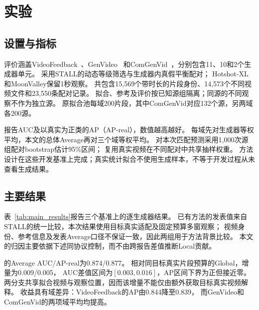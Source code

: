 \section{实验}
\label{sec:experiments}

\subsection{设置与指标}
评价涵盖VideoFeedback~\cite{he2024videoscore}、GenVideo~\cite{chen2024genvideo}
和ComGenVid~\cite{benhayun2026stall}，分别包含11、10和2个生成器单元。
采用STALL的动态等级筛选与生成器内真假平衡配对；
Hotshot-XL和MoonValley保留1秒观察。
共包含15,569个带时长的片段身份、14,573个不同视频文件和23,550条配对记录。
拟合、参考及评价按已知源组隔离；同源的不同观察不作为独立源。
原拟合池每域200片段，其中ComGenVid对应132个源，另两域各200源。

报告AUC及以真实为正类的AP（AP-real），数值越高越好。
每域先对生成器等权平均，本文的总体Average再对三个域等权平均。
对本次匹配预测采用1,000次源组配对bootstrap估计95\%区间；
复用真实视频在不同配对中共享抽样权重。
方法设计在这些开发基准上完成；真实统计拟合不使用生成样本，不等于开发过程从未查看生成结果。

\subsection{主要结果}



表~\ref{tab:main_results}报告三个基准上的逐生成器结果。
已有方法的发表值来自STALL的统一比较，本次结果使用目标真实适配及固定预算多窗观察；
视频身份、参考信息及发表Average口径不保证一致，因此两组用于方法背景比较。
本文的归因主要依据下述同协议控制，而不由跨报告差值推断Local贡献。

\method 的Average AUC/AP-real为0.874/0.877。
相对同目标真实片段预算的Global，增量为0.009/0.005，
AUC差值区间为$[0.003,0.016]$，AP区间下界为正但接近零。
两分支共享拟合视频与观察位置，因而该增量不能仅由额外获取目标真实视频解释。
收益具有域差异：VideoFeedback的AP由0.844降至0.839，
而GenVideo和ComGenVid的两项域平均均提高。
